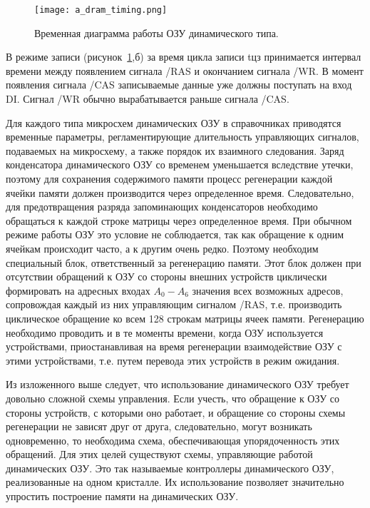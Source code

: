 \begin{figure}[ht]
\centering
  \texttt{[image: a\_dram\_timing.png]}  
  \caption{ Временная диаграмма работы ОЗУ динамического типа. }
  \label{fig:domain:ram:dram:dram_timing}
\end{figure}

В режиме записи (рисунок~\ref{fig:domain:ram:dram:dram_timing},б) за время цикла записи tцз принимается интервал времени между появлением сигнала /RAS и окончанием сигнала /WR. В момент появления сигнала /CAS записываемые данные уже должны поступать на вход DI. Сигнал /WR обычно вырабатывается раньше сигнала /CAS.

Для каждого типа микросхем динамических ОЗУ в справочниках приводятся временные параметры, регламентирующие длительность управляющих сигналов, подаваемых на микросхему, а также порядок их взаимного следования.
Заряд конденсатора динамического ОЗУ со временем уменьшается вследствие утечки, поэтому для сохранения содержимого памяти процесс регенерации каждой ячейки памяти должен производится через определенное время. Следовательно, для предотвращения разряда запоминающих конденсаторов необходимо обращаться к каждой строке матрицы через определенное время. При обычном режиме работы ОЗУ это условие не соблюдается, так как обращение к одним ячейкам происходит часто, а к другим очень редко. Поэтому необходим специальный блок, ответственный за регенерацию памяти. Этот блок должен при отсутствии обращений к ОЗУ со стороны внешних устройств циклически формировать на адресных входах $A_0 - A_6$ значения всех возможных адресов, сопровождая каждый из них управляющим сигналом /RAS, т.е. производить циклическое обращение ко всем 128 строкам матрицы ячеек памяти. Регенерацию необходимо проводить и в те моменты времени, когда ОЗУ используется устройствами, приостанавливая на время регенерации взаимодействие ОЗУ с этими устройствами, т.е. путем перевода этих устройств в режим ожидания.

Из изложенного выше следует, что использование динамического ОЗУ требует довольно сложной схемы управления. Если учесть, что обращение к ОЗУ со стороны устройств, с которыми оно работает, и обращение со стороны схемы регенерации не зависят друг от друга, следовательно, могут возникать одновременно, то необходима схема, обеспечивающая упорядоченность этих обращений. Для этих целей существуют схемы, управляющие работой динамических ОЗУ. Это так называемые контроллеры динамического ОЗУ, реализованные на одном кристалле. Их использование позволяет значительно упростить построение памяти на динамических ОЗУ.

